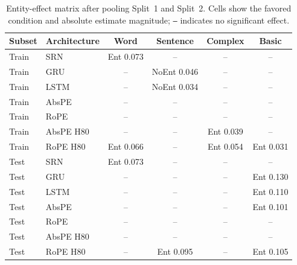 \begin{table}[t]
\centering\scriptsize
\setlength{\tabcolsep}{3pt}
\begin{tabular}{@{}llcccc@{}}
\toprule
\textbf{Subset} & \textbf{Architecture} & \textbf{Word} & \textbf{Sentence} & \textbf{Complex} & \textbf{Basic} \\
\midrule
Train & SRN & Ent 0.073 & -- & -- & -- \\
Train & GRU & -- & NoEnt 0.046 & -- & -- \\
Train & LSTM & -- & NoEnt 0.034 & -- & -- \\
Train & AbsPE & -- & -- & -- & -- \\
Train & RoPE & -- & -- & -- & -- \\
Train & AbsPE H80 & -- & -- & Ent 0.039 & -- \\
Train & RoPE H80 & Ent 0.066 & -- & Ent 0.054 & Ent 0.031 \\
Test & SRN & Ent 0.073 & -- & -- & -- \\
Test & GRU & -- & -- & -- & Ent 0.130 \\
Test & LSTM & -- & -- & -- & Ent 0.110 \\
Test & AbsPE & -- & -- & -- & Ent 0.101 \\
Test & RoPE & -- & -- & -- & -- \\
Test & AbsPE H80 & -- & -- & -- & -- \\
Test & RoPE H80 & -- & Ent 0.095 & -- & Ent 0.105 \\
\bottomrule
\end{tabular}
\caption{\small Entity-effect matrix after pooling Split~1 and Split~2. Cells show the favored condition and absolute estimate magnitude; \texttt{--} indicates no significant effect.}
\label{tab:gap_entity_matrix}
\end{table}

